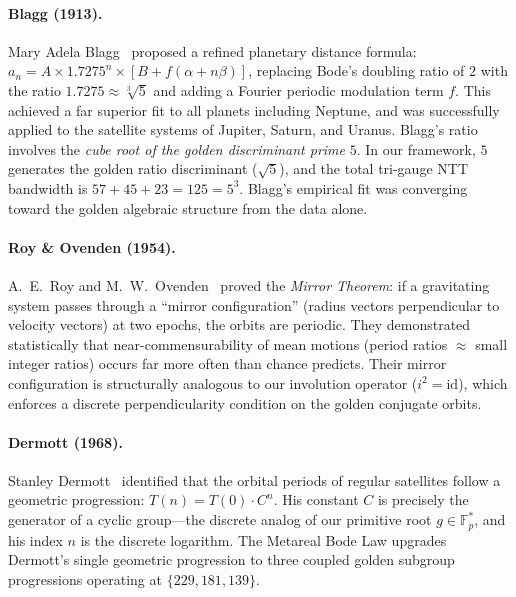 \paragraph{Blagg (1913).}
Mary Adela Blagg~\cite{blagg1913} proposed a refined planetary distance formula: $a_n = A \times 1.7275^n \times [B + f(\alpha + n\beta)]$, replacing Bode's doubling ratio of $2$ with the ratio $1.7275 \approx \sqrt[3]{5}$ and adding a Fourier periodic modulation term $f$. This achieved a far superior fit to all planets including Neptune, and was successfully applied to the satellite systems of Jupiter, Saturn, and Uranus. Blagg's ratio involves the \emph{cube root of the golden discriminant prime} $5$. In our framework, $5$ generates the golden ratio discriminant ($\sqrt{5}$), and the total tri-gauge NTT bandwidth is $57 + 45 + 23 = 125 = 5^3$. Blagg's empirical fit was converging toward the golden algebraic structure from the data alone.

\paragraph{Roy \& Ovenden (1954).}
A.~E.~Roy and M.~W.~Ovenden~\cite{roy1954} proved the \emph{Mirror Theorem}: if a gravitating system passes through a ``mirror configuration'' (radius vectors perpendicular to velocity vectors) at two epochs, the orbits are periodic. They demonstrated statistically that near-commensurability of mean motions (period ratios $\approx$ small integer ratios) occurs far more often than chance predicts. Their mirror configuration is structurally analogous to our involution operator ($i^2 = \mathrm{id}$), which enforces a discrete perpendicularity condition on the golden conjugate orbits.

\paragraph{Dermott (1968).}
Stanley Dermott~\cite{dermott1968} identified that the orbital periods of regular satellites follow a geometric progression: $T(n) = T(0) \cdot C^n$. His constant $C$ is precisely the generator of a cyclic group---the discrete analog of our primitive root $g \in \mathbb{F}_p^*$, and his index $n$ is the discrete logarithm. The Metareal Bode Law upgrades Dermott's single geometric progression to three coupled golden subgroup progressions operating at $\{229, 181, 139\}$.

